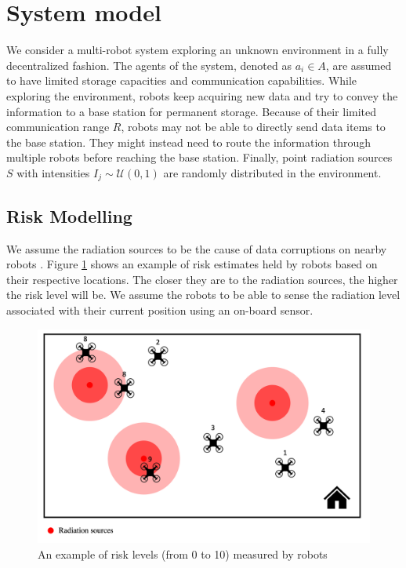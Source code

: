 \section{System model}
We consider a multi-robot system exploring an unknown environment in a fully decentralized fashion. The agents of the system, denoted as $a_i \in A$, are assumed to have limited storage capacities and communication capabilities. While exploring the environment, robots keep acquiring new data and try to convey the information to a base station for permanent storage. Because of their limited communication range $R$, robots may not be able to directly send data items to the base station. They might instead need to route the information through multiple robots before reaching the base station. Finally, point radiation sources $S$ with intensities $I_j\sim\mathcal{U}(0, 1)$ are randomly distributed in the environment.   

\subsection{Risk Modelling}
We assume the radiation sources to be the cause of data corruptions on nearby robots \cite{sharp1996radiation,messenger1986effects}. Figure \ref{risk_level_rass} shows an example of risk estimates held by robots based on their respective locations. The closer they are to the radiation sources, the higher the risk level will be. We assume the robots to be able to sense the radiation level associated with their current position using an on-board sensor.

\begin{figure}[h]
	\centering
    \includegraphics[width=0.95\columnwidth]{images/risk_rass.png}
    \caption{An example of risk levels (from 0 to 10) measured by robots}
    \label{risk_level_rass}
\end{figure}

